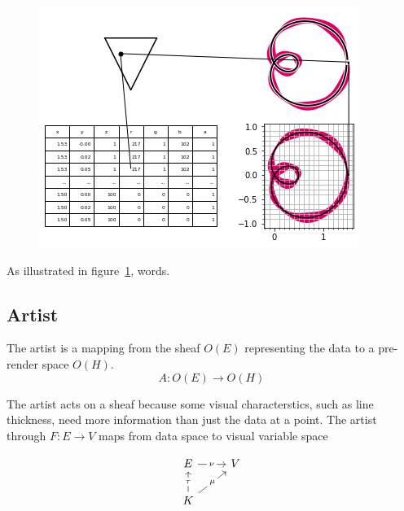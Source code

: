 \documentclass[../main.tex]{subfiles}
\begin{document}
\begin{figure}[h]
    \includegraphics[width=.4\linewidth]{figures/sections/math/render.png}
    \caption{}
    \label{fig:render}
\end{figure}

As illustrated in figure~\ref{fig:render}, words.

\subsection{Artist}

The artist is a mapping from the sheaf $O(E)$ representing the data to a pre-render space $O(H)$. 
\begin{equation}
    A: O(E) \rightarrow O(H)
\end{equation}

The artist acts on a sheaf because some visual characterstics, such as line thickness, need more information than just the data at a point. The artist through $F: E \rightarrow V$ maps from data space to visual variable  \cite{carpendaleVisualRepresentationSemiology,bertinIIPropertiesGraphic2011,munznerWhatDataAbstraction2014} space

\begin{equation}
    \begin{tikzcd}
        E \arrow[r, "\nu" description]                                & V \\
        K \arrow[u, "\tau" description] \arrow[ru, "\mu" description] &  
    \end{tikzcd}
\end{equation}
\end{document}
